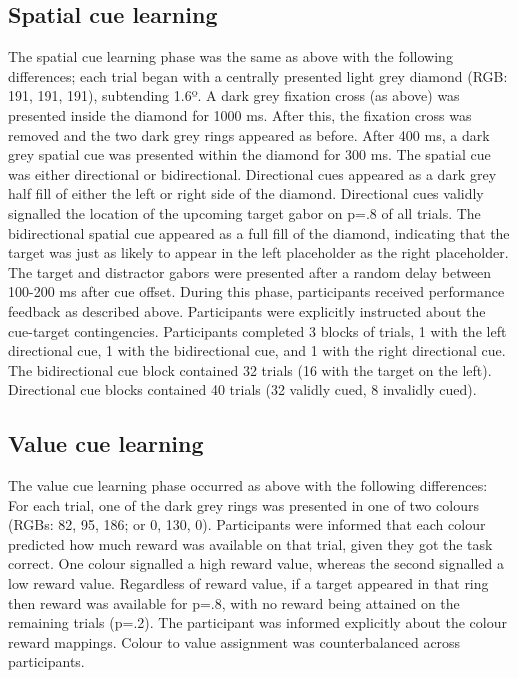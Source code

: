\documentclass[11pt,halfline,a4paper,]{ouparticle}
\begin{document}
\hypertarget{spatial-cue-learning}{%
\subsection{Spatial cue learning}\label{spatial-cue-learning}}

The spatial cue learning phase was the same as above with the following differences; each trial began with a centrally presented light grey diamond (RGB: 191, 191, 191), subtending 1.6º. A dark grey fixation cross (as above) was presented inside the diamond for 1000 ms. After this, the fixation cross was removed and the two dark grey rings appeared as before. After 400 ms, a dark grey spatial cue was presented within the diamond for 300 ms. The spatial cue was either directional or bidirectional. Directional cues appeared as a dark grey half fill of either the left or right side of the diamond. Directional cues validly signalled the location of the upcoming target gabor on p=.8 of all trials. The bidirectional spatial cue appeared as a full fill of the diamond, indicating that the target was just as likely to appear in the left placeholder as the right placeholder. The target and distractor gabors were presented after a random delay between 100-200 ms after cue offset. During this phase, participants received performance feedback as described above. Participants were explicitly instructed about the cue-target contingencies. Participants completed 3 blocks of trials, 1 with the left directional cue, 1 with the bidirectional cue, and 1 with the right directional cue. The bidirectional cue block contained 32 trials (16 with the target on the left). Directional cue blocks contained 40 trials (32 validly cued, 8 invalidly cued).

\hypertarget{value-cue-learning}{%
\subsection{Value cue learning}\label{value-cue-learning}}

The value cue learning phase occurred as above with the following differences: For each trial, one of the dark grey rings was presented in one of two colours (RGBs: 82, 95, 186; or 0, 130, 0). Participants were informed that each colour predicted how much reward was available on that trial, given they got the task correct. One colour signalled a high reward value, whereas the second signalled a low reward value. Regardless of reward value, if a target appeared in that ring then reward was available for p=.8, with no reward being attained on the remaining trials (p=.2). The participant was informed explicitly about the colour reward mappings. Colour to value assignment was counterbalanced across participants.
\end{document}
